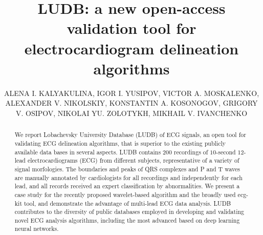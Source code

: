 \documentclass[submitted]{ieeeaccess}
\newcommand{\DeletedText}[1]{}
\newcommand{\NewCorrection}[1]{{#1}}
\begin{document}
    


\doi{}

\title{LUDB: a new open-access validation tool for electrocardiogram delineation algorithms}

\author{\uppercase{Alena I. Kalyakulina},
    \uppercase{Igor I. Yusipov},
    \uppercase{Victor A. Moskalenko},
    \uppercase{Alexander V. Nikolskiy},
    \uppercase{Konstantin A. Kosonogov},
    \uppercase{Grigory V. Osipov},
    \uppercase{Nikolai Yu. Zolotykh},
    \uppercase{Mikhail V. Ivanchenko}}

\address[1]{Institute of Information Technologies, Mathematics and Mechanics, Lobachevsky University, Nizhni
Novgorod, Russia}

\address[2]{Department of Cardiovascular Surgery, City Clinical Hospital No 5, Nizhni Novgorod, Russia}






\begin{abstract}
We report Lobachevsky University Database (LUDB) of ECG signals, \NewCorrection{an open tool for validating ECG delineation algorithms, that is superior to the existing publicly available data bases in several aspects. LUDB} contains $200$ recordings of $10$-second $12$-lead electrocardiograms (ECG) from different subjects, \NewCorrection{representative of a variety of signal morfologies}. The boundaries and peaks of QRS \NewCorrection{complexes} and P and T waves are manually annotated by cardiologists for all recordings and independently for each lead, and all records received an expert classification by abnormalities. \DeletedText{In addition, the database is representative of a variety of signal morphologies. These features make LUDB a promising tool for validating ECG delineation algorithms across a broad range of ECG signal shapes and patient diagnoses.} \NewCorrection{We present} a case study for the recently proposed wavelet-based algorithm \DeletedText{is presented.} \NewCorrection{and the broadly used ecg-kit tool, and demonstrate the advantage of multi-lead ECG data analysis. LUDB contributes to the diversity of public databases employed in developing and validating novel ECG analysis algorithms, including the most advanced based on deep learning neural networks.}  
\end{abstract}
\end{document}
